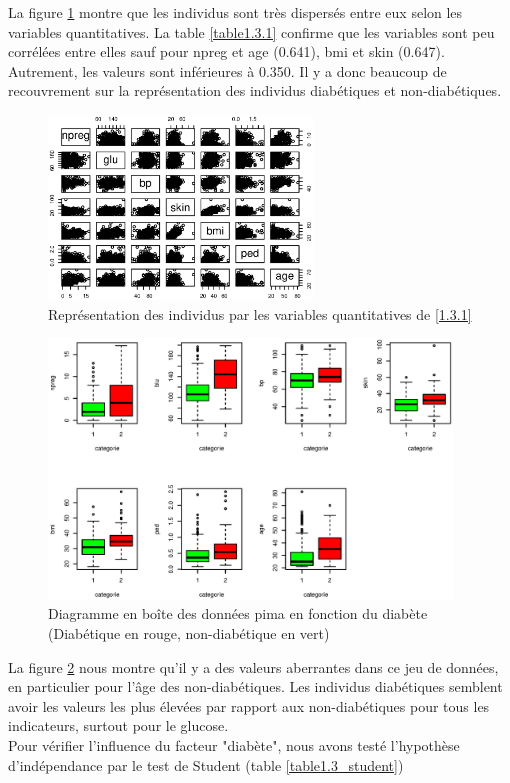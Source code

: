 \documentclass{article}
\begin{document}
La figure \ref{fig:pima-quant_plot} montre que les individus sont très dispersés entre eux selon les variables quantitatives.
La table \ref{table1.3.1} confirme que les variables sont peu corrélées entre elles sauf pour npreg et age (0.641), bmi et skin (0.647). Autrement, les valeurs sont inférieures à 0.350. Il y a donc beaucoup de recouvrement sur la représentation des individus diabétiques et non-diabétiques.

\begin{figure}[!ht]
\centering
\includegraphics[width=7cm]{./img/pima-quant_plot.eps}
\caption{Représentation des individus par les variables quantitatives de \ref{1.3.1}}
\label{fig:pima-quant_plot}
\end{figure}



\begin{figure}[H]
\centering
\includegraphics[width=10.71cm]{./img/pima_boxplot.eps}
\caption{Diagramme en boîte des données pima en fonction du diabète\\(Diabétique en rouge, non-diabétique en vert)}
\label{fig:pima_boxplot}
\end{figure}

La figure \ref{fig:pima_boxplot} nous montre qu'il y a des valeurs aberrantes dans ce jeu de données, en particulier pour l'âge des non-diabétiques. Les individus diabétiques semblent avoir les valeurs les plus élevées par rapport aux non-diabétiques pour tous les indicateurs, surtout pour le glucose.\\ Pour vérifier l'influence du facteur "diabète", nous avons testé l'hypothèse d'indépendance par le test de Student (table \ref{table1.3_student})
\end{document}
